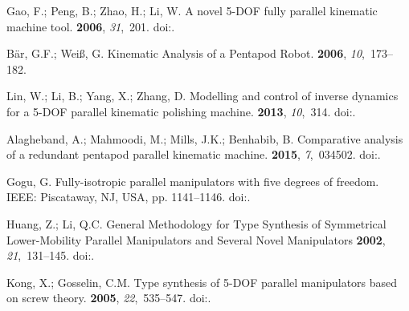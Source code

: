 \documentclass[robotics,article,accept,moreauthors,pdftex]{Definitions/mdpi}
\begin{document}
\begin{thebibliography}{999}
Gao, F.; Peng, B.; Zhao, H.; Li, W.
\newblock A novel 5-DOF fully parallel kinematic machine tool.
  {\bf 2006}, {\em 31},~201.
\newblock
  doi:{\href{https://doi.org/10.1007/s00170-005-0171-1}{}}.

Bär, G.F.; Weiß, G.
\newblock Kinematic Analysis of a Pentapod Robot.
 {\bf 2006}, {\em
    10},~173--182.

Lin, W.; Li, B.; Yang, X.; Zhang, D.
\newblock Modelling and control of inverse dynamics for a 5-DOF parallel
  kinematic polishing machine.
 {\bf 2013},
  {\em 10},~314.
\newblock
  doi:{\href{https://doi.org/10.5772/54966}{}}.

Alagheband, A.; Mahmoodi, M.; Mills, J.K.; Benhabib, B.
\newblock Comparative analysis of a redundant pentapod parallel kinematic
  machine.
 {\bf 2015}, {\em 7},~034502.
\newblock
  doi:{\href{https://doi.org/10.1115/1.4028933}{}}.

Gogu, G.
\newblock Fully-isotropic parallel manipulators with five degrees of freedom.
 IEEE: Piscataway, NJ, USA, pp. 1141--1146.
\newblock
  doi:{\href{https://doi.org/10.1109/ROBOT.2006.1641863}{}}.

Huang, Z.; Li, Q.C.
\newblock General Methodology for Type Synthesis of Symmetrical Lower-Mobility
  Parallel Manipulators and Several Novel Manipulators
 {\bf 2002}, {\em 21},~131--145.
\newblock
  doi:{\href{https://doi.org/10.1177/027836402760475342}{}}.

Kong, X.; Gosselin, C.M.
\newblock Type synthesis of 5-DOF parallel manipulators based on screw theory.
 {\bf 2005}, {\em 22},~535--547.
\newblock
  doi:{\href{https://doi.org/10.1002/rob.20084}{}}.


\end{thebibliography}
\end{document}
